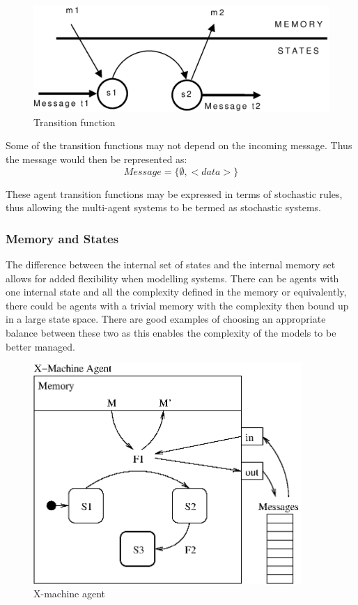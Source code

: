\documentclass[a4paper,11pt]{article}
\begin{document}
\begin{figure}
\begin{center}
\includegraphics*[scale=0.5]{transfn.eps}
\caption{Transition function} \label{fig:trans}
\end{center}
\end{figure}

Some of the transition functions may not depend on the incoming
message. Thus the message would then be represented as:
\begin{equation}\label{msg}
    Message = \{ \emptyset, <data> \}
\end{equation}

These agent transition functions may be expressed in terms of
stochastic rules, thus allowing the multi-agent systems to be termed
as stochastic systems.

\subsubsection{Memory and States}
The difference between the internal set of states and the internal
memory set allows for added flexibility when modelling systems.
There can be agents with one internal state and all the complexity
defined in the memory or equivalently, there could be agents with
a trivial memory with the complexity then bound up in a large state
space. There are good examples of choosing an appropriate balance
between these two as this enables the complexity of the models to be
better managed.

\begin{figure}
\begin{center}
\includegraphics*[width = 4in]{X-Machine_agent.eps}
\caption{X-machine agent} \label{fig:xmachine}
\end{center}
\end{figure}
\end{document}
